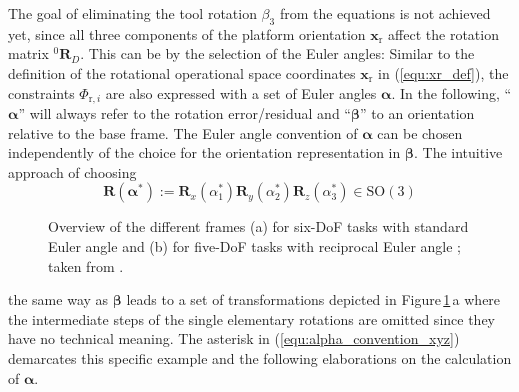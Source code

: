 \documentclass[robotics,article,accept,moreauthors,pdftex]{Definitions/mdpi}
\newcommand{\bm}[1]{\boldsymbol{#1}}
\newcommand{\rotmat}[2]{{{ }^{#1}\boldsymbol{R}}_{#2}}
\let\Phi\varPhi
\begin{document}
The goal of eliminating the tool rotation $\beta_3$ from the equations is not achieved yet, since all three components of the platform orientation $\bm{x}_\mathrm{r}$ affect the rotation matrix $\rotmat{0}{D}$.
This can be  by the selection of the Euler angles:
Similar to the definition of the rotational operational space coordinates $\bm{x}_\mathrm{r}$ in (\ref{equ:xr_def}), the constraints $\bm{\Phi}_{\mathrm{r},i}$ are also expressed with a set of Euler angles $\bm{\alpha}$.
In the following, ``$\bm{\alpha}$'' will always refer to the rotation error/residual and ``$\bm{\beta}$'' to an orientation relative to the base frame.
The Euler angle convention of $\bm{\alpha}$ can be chosen independently of the choice for the orientation representation in $\bm{\beta}$.
The intuitive approach of choosing
%
\begin{equation}
\bm{R}(\bm{\alpha}^*) := \bm{R}_x(\alpha_1^*) \bm{R}_y(\alpha_2^*) \bm{R}_z(\alpha_3^*) \in \mathrm{SO(3)}
\label{equ:alpha_convention_xyz}
\end{equation}
%
\begin{figure}[b]
    
    \caption{Overview of the different frames (a) for six-DoF tasks with standard Euler angle  and (b) for five-DoF tasks with reciprocal Euler angle ; taken from \cite{1_SchapplerTapOrt2019}.}
    \label{fig:frames_5dof_6dof}
\end{figure} 
%
%
the same way as $\bm{\beta}$ leads to a set of transformations depicted in Figure\,\ref{fig:frames_5dof_6dof}\,a\added[id=Sp]{,} where the intermediate steps of the single elementary rotations are omitted since they have no technical meaning.
The  asterisk in (\ref{equ:alpha_convention_xyz}) demarcates this specific example and the following elaborations on the calculation of $\bm{\alpha}$.
\end{document}
